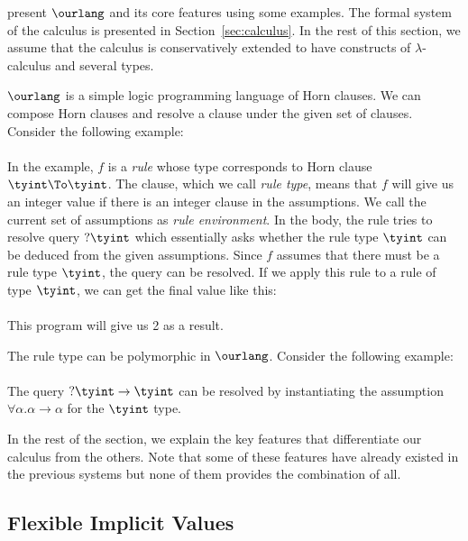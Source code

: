 present $\ourlang$ and its core features using
some examples. The formal system of the calculus is presented in
Section~\ref{sec:calculus}. In the rest of this section, we assume
that the calculus is conservatively extended to have constructs of
$\lambda$-calculus and several types.

$\ourlang$ is a simple logic programming language of Horn clauses. We
can compose Horn clauses and resolve a clause under the given set of
clauses. Consider the following example:
\\
\\
In the example, $f$ is a {\it rule} whose type corresponds to Horn
clause $\tyint \To \tyint$. The clause, which we call {\it rule type},
means that $f$ will give us an integer value if there is an integer
clause in the assumptions. We call the current set of assumptions as
{\it rule environment}. In the body, the rule tries to resolve query
$?\tyint$ which essentially asks whether the rule type $\tyint$ can be
deduced from the given assumptions. Since $f$ assumes that there must
be a rule type $\tyint$, the query can be resolved. If we apply this
rule to a rule of type $\tyint$, we can get the final value like this:
\\
\\
This program will give us 2 as a result.

The rule type can be polymorphic in $\ourlang$. Consider the following
example:
\\
\\
The query $?\tyint \to \tyint$ can be resolved by instantiating the
assumption $\forall \alpha. \alpha \to \alpha$ for the $\tyint$
type. 

In the rest of the section, we explain the key features that
differentiate our calculus from the others. Note that some of these
features have already existed in the previous systems but none of them
provides the combination of all.

\subsection{Flexible Implicit Values}
\label{subsec:flexible}

